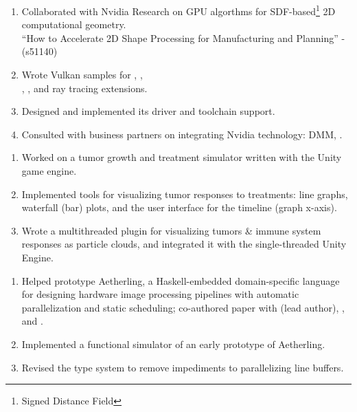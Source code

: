 \begin{enumerate}
\item Collaborated with Nvidia Research on GPU algorthms for
  SDF-based\footnote{Signed Distance Field} 2D computational
  geometry.\\ ``How to Accelerate 2D Shape Processing for
  Manufacturing and Planning'' -
   (s51140)

\item Wrote Vulkan samples for
  ,
  ,\\
  ,
  , and ray tracing extensions.

\item
  Designed
  \texttt{}
  and implemented its driver and toolchain support.

\item Consulted with business partners on integrating Nvidia
  technology: DMM, .
\end{enumerate}
\filbreak
{}
\begin{enumerate}
\item Worked on a tumor growth and treatment simulator written with
  the Unity game engine.
\item Implemented tools for visualizing tumor responses to treatments:
  line graphs, waterfall (bar) plots, and the user interface for the
  timeline (graph x-axis).
\item Wrote a multithreaded  plugin for visualizing
  tumors \& immune system responses as particle clouds, and integrated
  it with the single-threaded  Unity Engine.
\end{enumerate}
\filbreak
{}
\begin{enumerate}
\item Helped prototype Aetherling, a Haskell-embedded domain-specific
  language for designing hardware image processing pipelines with
  automatic parallelization and static scheduling;
  co-authored paper with
   (lead author),
  ,
  and .
\item Implemented a functional simulator of an early prototype of
  Aetherling.
\item Revised the type system to remove impediments to parallelizing
  line buffers.
\end{enumerate}
